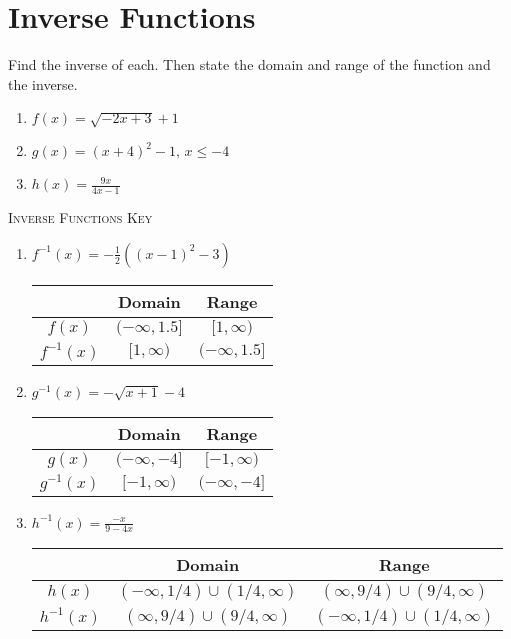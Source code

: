 \chapter{Inverse Functions}

Find the inverse of each. Then state the domain and range of the function and the inverse.

\begin{enumerate}
	\item $f(x) = \sqrt{-2x + 3} + 1$
	\item $g(x) = (x+4)^2 - 1, \, x \leq -4$
	\item $h(x) = \frac{9x}{4x-1}$
\end{enumerate}

\newpage

\textsc{Inverse Functions Key}

\begin{enumerate}
	\item $f^{-1}(x) = -\frac{1}{2}\left((x-1)^2-3\right)$ \newline\\
     \begin{tabular}{c|c|c}
         &   Domain  &   Range   \\  \hline
         $f(x)$ & $(-\infty, 1.5]$ & $[1, \infty)$ \\ \hline
         $f^{-1}(x)$ & $[1, \infty)$ & $(-\infty, 1.5]$ \\ 
     \end{tabular}
     
     \item $g^{-1}(x) = -\sqrt{x+1}-4$   \newline\\
     \begin{tabular}{c|c|c}
         &   Domain  &   Range   \\  \hline
         $g(x)$ & $(-\infty, -4]$ & $[-1, \infty)$ \\ \hline
         $g^{-1}(x)$ & $[-1, \infty)$ & $(-\infty, -4]$ \\ 
     \end{tabular}
     
     \item $h^{-1}(x) = \frac{-x}{9-4x}$ \newline\\
     \begin{tabular}{c|c|c}
         &   Domain  &   Range   \\  \hline
         $h(x)$ & $(-\infty, 1/4) \cup (1/4, \infty) $ & $(\infty, 9/4) \cup (9/4, \infty)$ \\ \hline
         $h^{-1}(x)$ & $(\infty, 9/4) \cup (9/4, \infty)$ & $(-\infty, 1/4) \cup (1/4, \infty) $ \\ 
     \end{tabular}
\end{enumerate}
